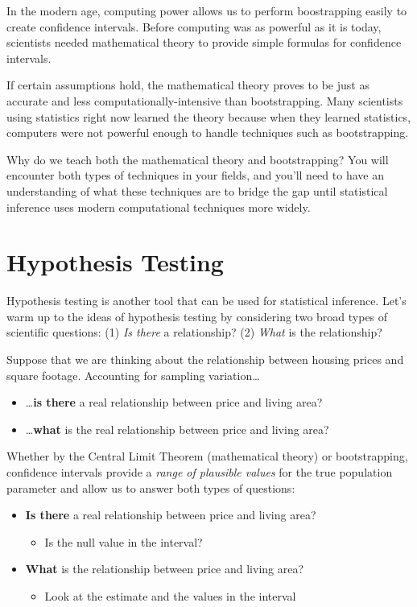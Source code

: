 \documentclass[]{book}
\providecommand{\tightlist}{%
  \setlength{\itemsep}{0pt}\setlength{\parskip}{0pt}}
\begin{document}
In the modern age, computing power allows us to perform boostrapping easily to create confidence intervals. Before computing was as powerful as it is today, scientists needed mathematical theory to provide simple formulas for confidence intervals.

If certain assumptions hold, the mathematical theory proves to be just as accurate and less computationally-intensive than bootstrapping. Many scientists using statistics right now learned the theory because when they learned statistics, computers were not powerful enough to handle techniques such as bootstrapping.

Why do we teach both the mathematical theory and bootstrapping? You will encounter both types of techniques in your fields, and you'll need to have an understanding of what these techniques are to bridge the gap until statistical inference uses modern computational techniques more widely.

\hypertarget{hypothesis-testing}{%
\section{Hypothesis Testing}\label{hypothesis-testing}}

Hypothesis testing is another tool that can be used for statistical inference. Let's warm up to the ideas of hypothesis testing by considering two broad types of scientific questions: (1) \emph{Is there} a relationship? (2) \emph{What} is the relationship?

Suppose that we are thinking about the relationship between housing prices and square footage. Accounting for sampling variation\ldots{}

\begin{itemize}
\tightlist
\item
  \ldots{}\textbf{is there} a real relationship between price and living area?
\item
  \ldots{}\textbf{what} is the real relationship between price and living area?
\end{itemize}

Whether by the Central Limit Theorem (mathematical theory) or bootstrapping, confidence intervals provide a \emph{range of plausible values} for the true population parameter and allow us to answer both types of questions:

\begin{itemize}
\tightlist
\item
  \textbf{Is there} a real relationship between price and living area?

  \begin{itemize}
  \tightlist
  \item
    Is the null value in the interval?
  \end{itemize}
\item
  \textbf{What} is the relationship between price and living area?

  \begin{itemize}
  \tightlist
  \item
    Look at the estimate and the values in the interval
  \end{itemize}
\end{itemize}
\end{document}
